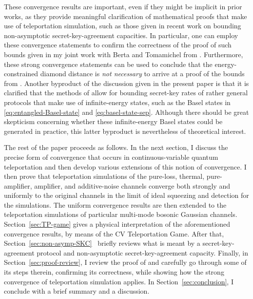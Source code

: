 \documentclass[apsrev,twocolumn]{revtex4-1}%
\begin{document}
These convergence results are important, even if they might be implicit in
prior works, as they provide meaningful clarification of mathematical proofs
that make use of teleportation simulation, such as those given in recent work
on bounding non-asymptotic secret-key-agreement capacities. In particular, one
can employ these convergence statements to confirm the correctness of the
proof of such bounds given in my joint work with Berta and Tomamichel from
\cite{WTB16}.
Furthermore, these strong convergence statements can be used to conclude that
the energy-constrained diamond distance is \textit{not necessary} to arrive at
a proof of the bounds from \cite{WTB16}.
Another byproduct of the discussion given in the present paper is that it is
clarified that the methods of \cite{WTB16} allow for bounding secret-key rates
of rather general protocols that make use of infinite-energy states, such as
the Basel states in \eqref{eq:entangled-Basel-state} and
\eqref{eq:basel-state-sep}. Although there should be great skepticism
concerning whether these infinite-energy Basel states could be generated in
practice, this latter byproduct is nevertheless of theoretical interest.

The rest of the paper proceeds as follows. In the next section, I discuss the
precise form of convergence that occurs in continuous-variable quantum
teleportation and then develop various extensions of this notion of
convergence. I then prove that teleportation simulations of the pure-loss,
thermal, pure-amplifier, amplifier, and additive-noise channels converge both
strongly and uniformly to the original channels in the limit of ideal
squeezing and detection for the simulations. The uniform convergence results are then extended to the teleportation simulations of particular multi-mode bosonic Gaussian channels.  Section~\ref{sec:TP-game} gives a
physical interpretation of the aforementioned convergence results, by means of
the CV Teleportation Game. After that, Section~\ref{sec:non-asymp-SKC}%
\ briefly reviews what is meant by a secret-key-agreement protocol and
non-asymptotic secret-key-agreement capacity. Finally, in
Section~\ref{sec:proof-review}, I review the proof of \cite[Theorem~24]{WTB16}
and carefully go through some of its steps therein, confirming its
correctness, while showing how the strong convergence of teleportation
simulation applies. In Section~\ref{sec:conclusion}, I conclude with a brief
summary and a discussion.
\end{document}

